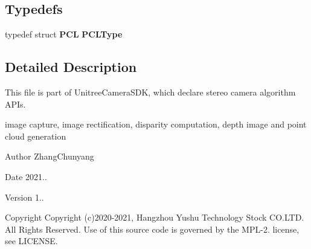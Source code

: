 \subsection*{Typedefs}
\begin{DoxyCompactItemize}
\item 
\mbox{\label{_stereo_camera_common_8hpp_ac9f36f2ca129cb52709d9b161d119f70}} 
typedef struct \textbf{ P\+CL} {\bfseries P\+C\+L\+Type}
\end{DoxyCompactItemize}


\subsection{Detailed Description}
This file is part of Unitree\+Camera\+S\+DK, which declare stereo camera algorithm A\+P\+Is. 

image capture, image rectification, disparity computation, depth image and point cloud generation \begin{DoxyAuthor}{Author}
Zhang\+Chunyang 
\end{DoxyAuthor}
\begin{DoxyDate}{Date}
2021.. 
\end{DoxyDate}
\begin{DoxyVersion}{Version}
1.. 
\end{DoxyVersion}
\begin{DoxyCopyright}{Copyright}
Copyright (c)2020-\/2021, Hangzhou Yushu Technology Stock C\+O.\+L\+TD. All Rights Reserved. Use of this source code is governed by the M\+P\+L-\/2. license, see L\+I\+C\+E\+N\+SE. 
\end{DoxyCopyright}
